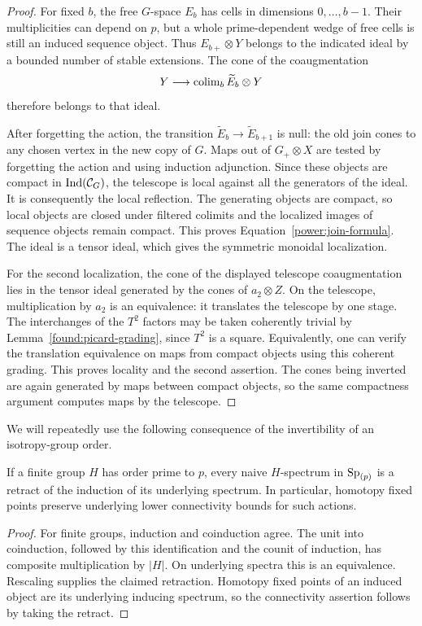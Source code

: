 \begin{proof}
For fixed $b$, the free $G$-space $E_b$ has cells in dimensions
$0,\ldots,b-1$. Their multiplicities can depend on $p$, but a whole
prime-dependent wedge of free cells is still an induced sequence
object. Thus $E_{b+}\otimes Y$ belongs to the indicated ideal by a
bounded number of stable extensions. The cone of the coaugmentation
\[
 Y\longrightarrow\operatorname{colim}_b\widetilde E_b\otimes Y
\]
therefore belongs to that ideal.

After forgetting the action, the transition
$\widetilde E_b\to\widetilde E_{b+1}$ is null: the old join cones to
any chosen vertex in the new copy of $G$. Maps out of $G_+\otimes X$
are tested by forgetting the action and using induction adjunction.
Since these objects are compact in $\mathrm{Ind}(\mathcal C_G)$, the telescope is
local against all the generators of the ideal. It is consequently the
local reflection. The generating objects are compact, so local
objects are closed under filtered colimits and the localized images
of sequence objects remain compact. This proves
Equation~\eqref{power:join-formula}. The ideal is a tensor ideal, which
gives the symmetric monoidal localization.

For the second localization, the cone of the displayed telescope
coaugmentation lies in the tensor ideal generated by the cones of
$a_2\otimes Z$. On the telescope, multiplication by $a_2$ is an
equivalence: it translates the telescope by one stage. The
interchanges of the $T^2$ factors may be taken coherently trivial by
Lemma~\ref{found:picard-grading}, since $T^2$ is a square. Equivalently,
one can verify the translation equivalence on maps from compact
objects using this coherent grading. This proves locality and the
second assertion. The cones being inverted are again generated by
maps between compact objects, so the same compactness argument
computes maps by the telescope.
\end{proof}

We will repeatedly use the following consequence of the invertibility
of an isotropy-group order.

\begin{lemma}
\label{power:prime-to-p}
If a finite group $H$ has order prime to $p$, every naive $H$-spectrum
in $\mathrm{Sp}_{(p)}$ is a retract of the induction of its underlying spectrum.
In particular, homotopy fixed points preserve underlying lower
connectivity bounds for such actions.
\end{lemma}

\begin{proof}
For finite groups, induction and coinduction agree. The unit into
coinduction, followed by this identification and the counit of
induction, has composite multiplication by $|H|$. On underlying
spectra this is an equivalence. Rescaling supplies the claimed
retraction. Homotopy fixed points of an induced object are its
underlying inducing spectrum, so the connectivity assertion follows
by taking the retract.
\end{proof}

